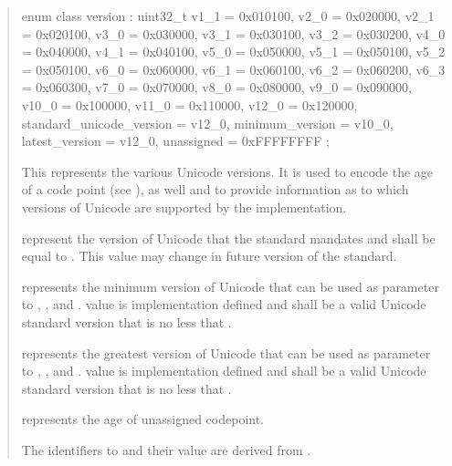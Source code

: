 \documentclass{wg21}
\begin{document}
\begin{quote}


\begin{itemdecl}
enum class version : uint32_t {
    v1_1        =  0x010100,
    v2_0        =  0x020000,
    v2_1        =  0x020100,
    v3_0        =  0x030000,
    v3_1        =  0x030100,
    v3_2        =  0x030200,
    v4_0        =  0x040000,
    v4_1        =  0x040100,
    v5_0        =  0x050000,
    v5_1        =  0x050100,
    v5_2        =  0x050100,
    v6_0        =  0x060000,
    v6_1        =  0x060100,
    v6_2        =  0x060200,
    v6_3        =  0x060300,
    v7_0        =  0x070000,
    v8_0        =  0x080000,
    v9_0        =  0x090000,
    v10_0       =  0x100000,
    v11_0       =  0x110000,
    v12_0       =  0x120000,
    standard_unicode_version = v12_0,
    minimum_version = v10_0,
    latest_version = v12_0,
    unassigned  =  0xFFFFFFFF
};
\end{itemdecl}
\begin{itemdescr}

This represents the various Unicode versions. It is used to encode the age of a code point (see ), as well and to provide
information as to which versions of Unicode are supported by the implementation.

 represent the version of Unicode that the standard mandates and shall be equal to .
This value may change in future version of the standard.

 represents the minimum version of Unicode that can be used as parameter to , ,  and .
 value is implementation defined and shall be a valid Unicode standard version that is no less that .

 represents the greatest version of Unicode that can be used as parameter to , ,  and .
  value is implementation defined and shall be a valid Unicode standard version that is no less that .

 represents the age of unassigned codepoint.

The identifiers  to  and their value are derived from \cite{PropertyValueAliases}.


\end{itemdescr}
\end{quote}
\end{document}
